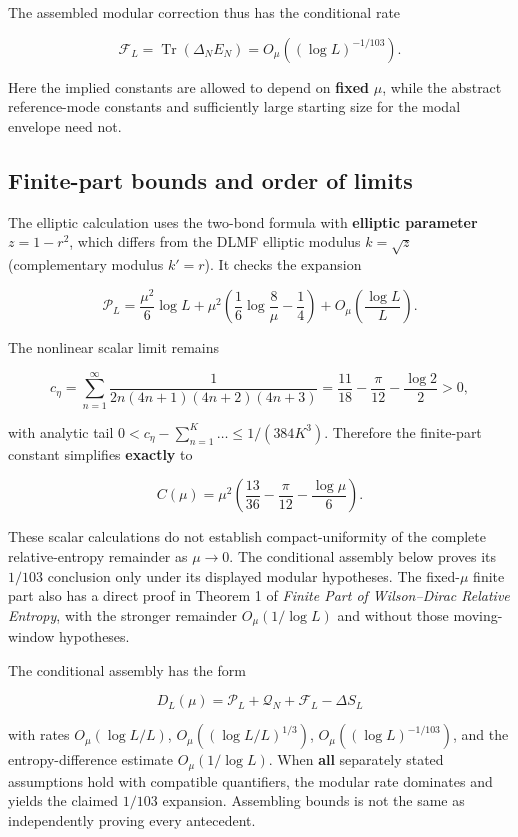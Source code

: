 \documentclass[
  10pt,
  a4paper,
]{article}
\begin{document}
The assembled modular correction thus has the conditional rate

\[
\mathcal F_L=\operatorname{Tr}(\Delta_N E_N)
=O_\mu((\log L)^{-1/103}).
\tag{S15}
\]

Here the implied constants are allowed to depend on \textbf{fixed} \(\mu\), while the abstract reference-mode constants and sufficiently large starting size for the modal envelope need not.

\subsection{Finite-part bounds and order of limits}\label{finite-part-bounds-and-order-of-limits}

The elliptic calculation uses the two-bond formula with \textbf{elliptic parameter} \(z=1-r^2\), which differs from the DLMF elliptic modulus \(k=\sqrt{z}\) (complementary modulus \(k'=r\)). It checks the expansion

\[
\mathcal P_L=\frac{\mu^2}{6}\log L
 +\mu^2\left(\frac16\log\frac8\mu-\frac14\right)
 +O_\mu\left(\frac{\log L}{L}\right).
\]

The nonlinear scalar limit remains

\[
 c_\eta=\sum_{n=1}^\infty\frac1{2n(4n+1)(4n+2)(4n+3)}
 =\frac{11}{18}-\frac\pi{12}-\frac{\log2}{2}>0,
\]

with analytic tail \(0 < c_\eta - \sum_{n=1}^K \ldots  \le 1/(384 K^3)\). Therefore the finite-part constant simplifies \textbf{exactly} to

\[
\boxed{C(\mu)=\mu^2\left(\frac{13}{36}-\frac\pi{12}-\frac{\log\mu}{6}\right).}
\]

These scalar calculations do not establish compact-uniformity of the complete relative-entropy remainder as \(\mu\to0\). The conditional assembly below proves its \(1/103\) conclusion only under its displayed modular hypotheses. The fixed-\(\mu\) finite part also has a direct proof in Theorem 1 of \emph{Finite Part of Wilson--Dirac Relative Entropy}, with the stronger remainder \(O_\mu(1/\log L)\) and without those moving-window hypotheses.

The conditional assembly has the form

\[
D_L(\mu)=\mathcal P_L+\mathcal Q_N+\mathcal F_L-\Delta S_L
\]

with rates \(O_\mu(\log L/L)\), \(O_\mu((\log L/L)^{1/3})\), \(O_\mu((\log L)^{-1/103})\), and the entropy-difference estimate \(O_\mu(1/\log L)\). When \textbf{all} separately stated assumptions hold with compatible quantifiers, the modular rate dominates and yields the claimed \(1/103\) expansion. Assembling bounds is not the same as independently proving every antecedent.
\end{document}
